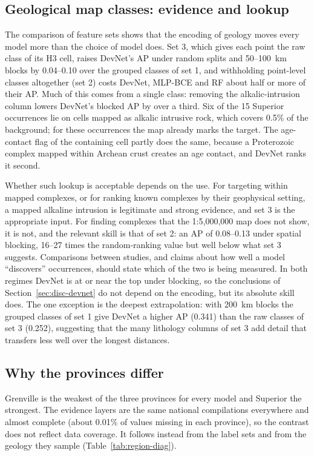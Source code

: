 \documentclass[pdflatex,sn-apa]{sn-jnl}
\begin{document}
\subsection{Geological map classes: evidence and lookup}\label{sec:disc-mapclasses}

The comparison of feature sets shows that the encoding of geology moves every model more than the choice of model does. Set 3, which gives each point the raw class of its H3 cell, raises DevNet's AP under random splits and 50--100~km blocks by 0.04--0.10 over the grouped classes of set 1, and withholding point-level classes altogether (set 2) costs DevNet, MLP-BCE and RF about half or more of their AP. Much of this comes from a single class: removing the alkalic-intrusion column lowers DevNet's blocked AP by over a third. Six of the 15 Superior occurrences lie on cells mapped as alkalic intrusive rock, which covers 0.5\% of the background; for these occurrences the map already marks the target. The age-contact flag of the containing cell partly does the same, because a Proterozoic complex mapped within Archean crust creates an age contact, and DevNet ranks it second.

Whether such lookup is acceptable depends on the use. For targeting within mapped complexes, or for ranking known complexes by their geophysical setting, a mapped alkaline intrusion is legitimate and strong evidence, and set 3 is the appropriate input. For finding complexes that the 1:5,000,000 map does not show, it is not, and the relevant skill is that of set 2: an AP of 0.08--0.13 under spatial blocking, 16--27 times the random-ranking value but well below what set 3 suggests. Comparisons between studies, and claims about how well a model ``discovers'' occurrences, should state which of the two is being measured. In both regimes DevNet is at or near the top under blocking, so the conclusions of Section~\ref{sec:disc-devnet} do not depend on the encoding, but its absolute skill does. The one exception is the deepest extrapolation: with 200~km blocks the grouped classes of set 1 give DevNet a higher AP (0.341) than the raw classes of set 3 (0.252), suggesting that the many lithology columns of set 3 add detail that transfers less well over the longest distances.

\subsection{Why the provinces differ}\label{sec:disc-provinces}

Grenville is the weakest of the three provinces for every model and Superior the strongest. The evidence layers are the same national compilations everywhere and almost complete (about 0.01\% of values missing in each province), so the contrast does not reflect data coverage. It follows instead from the label sets and from the geology they sample (Table~\ref{tab:region-diag}).
\end{document}
